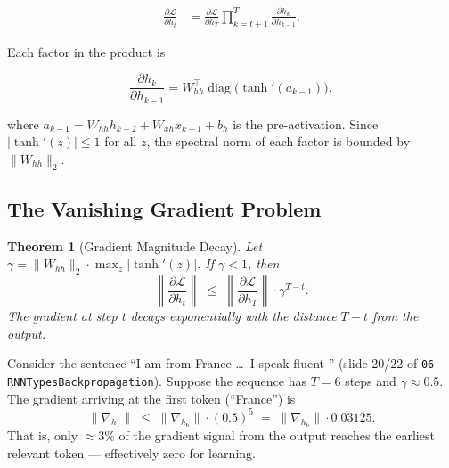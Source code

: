 \documentclass[12pt,a4paper]{article}
\newtheorem{theorem}{Theorem}[section]
\begin{document}
\begin{align}
  \label{eq:bptt-chain}
  \frac{\partial \mathcal{L}}{\partial h_t}
  &= \frac{\partial \mathcal{L}}{\partial h_T}
     \prod_{k=t+1}^{T}
     \frac{\partial h_k}{\partial h_{k-1}}.
\end{align}

Each factor in the product is

\begin{equation}
  \label{eq:jacobian-factor}
  \frac{\partial h_k}{\partial h_{k-1}}
  = W_{hh}^{\top} \operatorname{diag}\!\bigl(\tanh'(a_{k-1})\bigr),
\end{equation}

where $a_{k-1} = W_{hh}h_{k-2} + W_{xh}x_{k-1} + b_h$ is the
pre-activation. Since $|\tanh'(z)| \leq 1$ for all $z$, the spectral norm
of each factor is bounded by $\|W_{hh}\|_2$.

\subsection{The Vanishing Gradient Problem}
\label{subsec:vanishing}

\begin{theorem}[Gradient Magnitude Decay]
  \label{thm:vanishing}
  Let $\gamma = \|W_{hh}\|_2 \cdot \max_z|\tanh'(z)|$. If $\gamma < 1$,
  then
  \begin{equation}
    \label{eq:vanishing-bound}
    \left\|\frac{\partial \mathcal{L}}{\partial h_t}\right\|
    \;\leq\;
    \left\|\frac{\partial \mathcal{L}}{\partial h_T}\right\|
    \cdot \gamma^{T-t}.
  \end{equation}
  The gradient at step $t$ decays \emph{exponentially} with the distance
  $T - t$ from the output.
\end{theorem}

\begin{example}[title=Numerical Illustration (V04 scenario)]
  Consider the sentence ``I am from France \ldots\ I speak fluent
  \underline{\hspace{1em}}'' (slide 20/22 of \texttt{06-RNNTypesBackpropagation}).
  Suppose the sequence has $T = 6$ steps and $\gamma \approx 0.5$. The
  gradient arriving at the first token (``France'') is
  \[
    \|\nabla_{h_1}\| \;\leq\; \|\nabla_{h_6}\| \cdot (0.5)^{5}
    \;=\; \|\nabla_{h_6}\| \cdot 0.03125.
  \]
  That is, only $\approx 3\%$ of the gradient signal from the output
  reaches the earliest relevant token --- effectively zero for learning.
\end{example}
\end{document}
